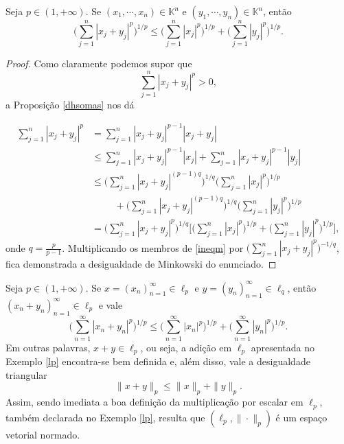 \begin{proposition}
Seja $p\in (1,+\infty)$. Se $(x_1, \cdots , x_n) \in \mathbb K^n$ e $(y_1, \cdots , y_n) \in \mathbb K^n$, então 
    \[
    \displaystyle \bigg( \sum_{j=1}^{n} |x_j + y_j|^p \bigg)^{1/p} \leq \bigg( \sum_{j=1}^{n} |x_j|^p \bigg)^{1/p} +\bigg( \sum_{j=1}^{n} |y_j|^p \bigg)^{1/p} .
    \]
\end{proposition}

\begin{proof}
Como claramente podemos supor que
\[
\displaystyle \sum_{j=1}^{n} |x_j + y_j|^p >0,
\]
a Proposição \ref{dhsomas} nos dá

\begin{align}
\displaystyle \sum_{j=1}^{n} |x_j + y_j|^p
&=\sum_{j=1}^{n} |x_j + y_j|^{p-1} |x_j + y_j| \nonumber \\
&\leq \sum_{j=1}^{n} |x_j + y_j|^{p-1} |x_j|
+\sum_{j=1}^{n} |x_j + y_j|^{p-1} |y_j| \nonumber \\
&\leq \bigg( \sum_{j=1}^{n} |x_j + y_j|^{(p-1)q} \bigg)^{1/q} \bigg( \sum_{j=1}^{n} |x_j|^p \bigg)^{1/p} \nonumber\\
&\hspace{1cm}+\bigg( \sum_{j=1}^{n} |x_j + y_j|^{(p-1)q} \bigg)^{1/q} \bigg( \sum_{j=1}^{n} |y_j|^p \bigg)^{1/p} \nonumber \\
&=\bigg( \sum_{j=1}^{n} |x_j + y_j|^{p} \bigg)^{1/q} \bigg[ \bigg( \sum_{j=1}^{n} |x_j|^p \bigg)^{1/p} + \bigg( \sum_{j=1}^{n} |y_j|^p \bigg)^{1/p}\bigg] \label{ineqm},
\end{align}
onde $q=\frac{p}{p-1}$. Multiplicando os membros de \eqref{ineqm} por $\bigg( \sum_{j=1}^{n} |x_j + y_j|^p \bigg)^{-1/q}$, fica demonstrada a desigualdade de Minkowski do enunciado.
\end{proof}

\begin{corollary}\label{dms}
    Seja $p\in (1,+\infty)$. Se $x=(x_n)_{n=1}^{\infty} \in \ell_p $ e $y=(y_n)_{n=1}^{\infty} \in \ell_q$, então $(x_n + y_n)_{n=1}^{\infty} \in \ell_p$ e vale
     \[
    \displaystyle \bigg( \sum_{n=1}^{\infty} |x_n + y_n|^p \bigg)^{1/p} \leq \bigg( \sum_{n=1}^{\infty} |x_n|^p \bigg)^{1/p} +\bigg( \sum_{n=1}^{\infty} |y_n|^p \bigg)^{1/p} .
    \]
    Em outras palavras, $x+y \in \ell_p$, ou seja, a adição em $\ell_p$ apresentada no Exemplo \ref{lp} encontra-se bem definida e, além disso, vale a desigualdade triangular
    \[
    \displaystyle \|x+y\|_p \leq \|x\|_p +\|y\|_p.
    \]
    Assim, sendo imediata a boa definição da multiplicação por escalar em $\ell_p$, também declarada no Exemplo \ref{lp}, resulta que $(\ell_p , \|\cdot\|_p)$ é um espaço vetorial normado.
\end{corollary}    

